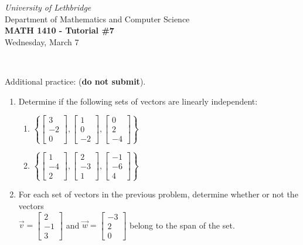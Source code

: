 \documentclass[12pt]{article}
\newcommand{\skipline}{\vspace{12pt}}
\newcommand{\bbm}{\begin{bmatrix}}
\newcommand{\ebm}{\end{bmatrix}}
\begin{document}
\author{Instructor: Sean Fitzpatrick}
\thispagestyle{empty}
\begin{center}
\emph{University of Lethbridge}\\
Department of Mathematics and Computer Science\\
{\bf MATH 1410 - Tutorial \#7}\\
Wednesday, March 7
\end{center}
\skipline \ \noindent \skipline

\vspace*{\fill}







Additional practice: (\textbf{do not submit}).
\begin{enumerate}
\item Determine if the following sets of vectors are linearly independent:
\begin{multicols}{2}
\begin{enumerate}
\item $\left\{\bbm 3\\-2\\0\ebm, \bbm 1\\0\\-2\ebm, \bbm 0\\2\\-4\ebm\right\}$
\item $\left\{\bbm 1\\-4\\2\ebm, \bbm 2\\-3\\1\ebm, \bbm -1\\-6\\4\ebm\right\}$
\end{enumerate}
\end{multicols}
\item For each set of vectors in the previous problem, determine whether or not the vectors\\ $\vec{v} = \bbm 2\\-1\\3\ebm$ and $\vec{w} = \bbm -3\\2\\0\ebm$ belong to the span of the set.
\end{enumerate}


\newpage
\end{document}
